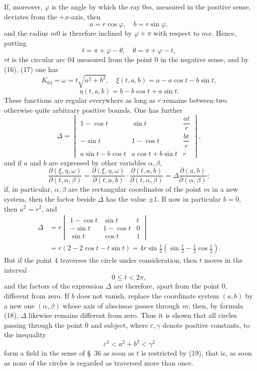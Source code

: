 \documentclass[11pt,a4paper,leqno]{article}
\begin{document}
If, moreover, $\varphi$ is the angle by which the ray $0m$, measured in the positive sense, deviates from the $+x$-axis, then
\begin{equation}\tag{17}
 a=r\cos\varphi,\quad b=r\sin\varphi,
\end{equation}
and the radius $m0$ is therefore inclined by $\varphi+\pi$ with respect to $mx$. Hence, putting
\[
 t=\pi+\varphi-\theta,\quad \theta=\pi+\varphi-t,
\]
$rt$ is the circular arc 04 measured from the point 0 in the negative sense, and by (16), (17) one has
\[
 K_{04}=\omega=t\sqrt{a^2+b^2},\quad
 \xi(t,a,b)=a-a\cos t-b\sin t,
\]
\[
 \eta(t,a,b)=b-b\cos t+a\sin t.
\]
These functions are regular everywhere as long as $r$ remains between two otherwise quite arbitrary positive bounds. One has further
\[
\Delta=\begin{vmatrix}
1-\cos t&\sin t&\dfrac{at}{r}\\[1.0ex]
-\sin t&1-\cos t&\dfrac{bt}{r}\\[1.0ex]
a\sin t-b\cos t&a\cos t+b\sin t&r
\end{vmatrix},
\]
and if $a$ and $b$ are expressed by other variables $\alpha,\beta$,
\begin{equation}\tag{18}
\frac{\partial(\xi,\eta,\omega)}{\partial(t,\alpha,\beta)}=
\frac{\partial(\xi,\eta,\omega)}{\partial(t,a,b)}\cdot
\frac{\partial(t,a,b)}{\partial(t,\alpha,\beta)}
=\Delta\frac{\partial(a,b)}{\partial(\alpha,\beta)};
\end{equation}
if, in particular, $\alpha,\beta$ are the rectangular coordinates of the point $m$ in a new system, then the factor beside $\Delta$ has the value
$\pm1$. If now in particular $b=0$, then $a^2=r^2$, and
\[
\begin{aligned}
\Delta&=r\begin{vmatrix}
1-\cos t&\sin t&t\\
-\sin t&1-\cos t&0\\
\sin t&\cos t&1
\end{vmatrix}\\
&=r(2-2\cos t-t\sin t)=4r\sin\frac{t}{2}\left(\sin\frac{t}{2}-\frac{t}{2}\cos\frac{t}{2}\right).
\end{aligned}
\]
But if the point 4 traverses the circle under consideration, then $t$ moves in the interval
\begin{equation}\tag{19}
0\leq t<2\pi,
\end{equation}
and the factors of the expression $\Delta$ are therefore, apart from the point 0, different from zero. If $b$ does not vanish, replace the coordinate system $(a,b)$ by a new one $(\alpha,\beta)$ whose axis of abscissae passes through $m$; then, by formula (18), $\Delta$ likewise remains different from zero. Thus it is shown that all circles passing through the point 0 and subject, where $\varepsilon,\gamma$ denote positive constants, to the inequality
\begin{equation}\tag{20}
\varepsilon^2<a^2+b^2<\gamma^2
\end{equation}
form a field in the sense of \S~36 as soon as $t$ is restricted by (19), that is, as soon as none of the circles is regarded as traversed more than once.
\end{document}
